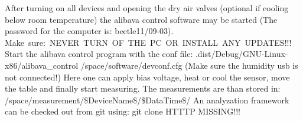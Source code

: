 \documentclass{article}
\begin{document}
After turning on all devices and opening the dry air valves (optional if cooling below room temperature) the alibava control software may be started (The password for the computer is: beetle11/09-03). 
\newline
\mbox{Make sure: NEVER TURN OF THE PC OR INSTALL ANY UPDATES!!!} 
\newline
Start the alibava control program with the conf file: 
\newline
 .dist/Debug/GNU-Linux-x86/alibava\_control /space/software/devconf.cfg
\newline
(Make sure the humidity usb is not connected!)
Here one can apply bias voltage, heat or cool the sensor, move the table and finally start measuring.
The measurements are than stored in:
\newline
 /space/measurement/\$DeviceName\$/\$DataTime\$/
\newline
An analyzation framework can be checked out from git using:
git clone HTTTP MISSING!!!
\end{document}
